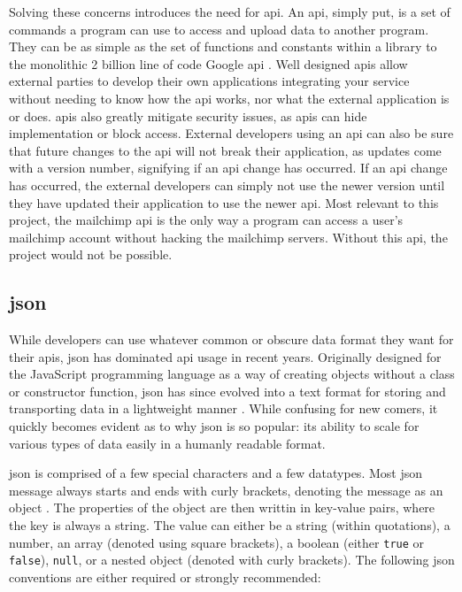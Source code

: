 \documentclass[11pt]{article}
\begin{document}
Solving these concerns introduces the need for \acrfull{api}. An \acrshort{api}, simply put, is a set of commands a program can use to access and upload data to another program. They can be as simple as the set of functions and constants within a \gls{library} to the monolithic 2 billion line of code Google \acrshort{api} \cite{google-api}. Well designed \acrshort{api}s allow external parties to develop their own applications integrating your service without needing to know how the \acrshort{api} works, nor what the external application is or does. \acrshort{api}s also greatly mitigate security issues, as \acrshort{api}s can hide implementation or block access. External developers using an \acrshort{api} can also be sure that future changes to the \acrshort{api} will not break their application, as updates come with a version number, signifying if an \acrshort{api} change has occurred. If an \acrshort{api} change has occurred, the external developers can simply not use the newer version until they have updated their application to use the newer \acrshort{api}. Most relevant to this project, the \Gls{mailchimp} \acrshort{api} is the only way a program can access a \gls{user}'s \Gls{mailchimp} account without hacking the \Gls{mailchimp} \glspl{server}. Without this \acrshort{api}, the project would not be possible.

\subsection{\acrshort{json}}

While developers can use whatever common or obscure data format they want for their \acrshort{api}s, \acrfull{json} has dominated \acrshort{api} usage in recent years. Originally designed for the JavaScript programming language as a way of creating \glspl{object} without a \gls{class} or constructor function, \acrshort{json} has since evolved into a text format for storing and transporting data in a lightweight manner \cite{json}. While confusing for new comers, it quickly becomes evident as to why \acrshort{json} is so popular: its ability to scale for various types of data easily in a humanly readable format.

\acrshort{json} is comprised of a few special characters and a few datatypes. Most \acrshort{json} message always starts and ends with curly brackets, denoting the message as an \gls{object} \cite{json}. The properties of the \gls{object} are then writtin in key-value pairs, where the key is always a string. The value can either be a string (within quotations), a number, an \gls{array} (denoted using square brackets), a boolean (either \texttt{true} or \texttt{false}), \texttt{null}, or a nested \gls{object} (denoted with curly brackets). The following \acrshort{json} conventions are either required or strongly recommended:
\end{document}
